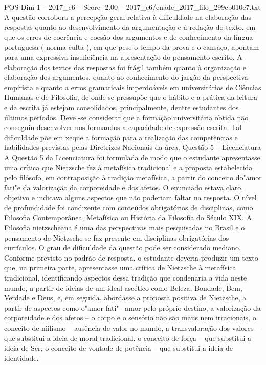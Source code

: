 \begin{textsample}{POS Dim 1 – 2017\_c6 – Score -2.00 – 2017\_c6/enade\_2017\_filo\_299cb010c7.txt}
A questão corrobora a percepção geral relativa à dificuldade na elaboração das respostas quanto ao desenvolvimento da argumentação e à redação do texto, em que os erros de coerência e coesão dos argumentos e de conhecimento da língua portuguesa ( norma culta ), em que pese o tempo da prova e o cansaço, apontam para uma expressiva insuficiência na apresentação do pensamento escrito.
A elaboração dos textos das respostas foi frágil também quanto à organização e elaboração dos argumentos, quanto ao conhecimento do jargão da perspectiva empirista e quanto a erros gramaticais imperdoáveis em universitários de Ciências Humanas e de Filosofia, de onde se pressupõe que o hábito e a prática da leitura e da escrita já estejam consolidados, principalmente, dentre estudantes dos últimos períodos.
Deve -se considerar que a formação universitária obtida não conseguiu desenvolver nos formandos a capacidade de expressão escrita.
Tal dificuldade põe em xeque a formação para a realização das competências e habilidades previstas pelas Diretrizes Nacionais da área.
Questão 5 – Licenciatura A Questão 5 da Licenciatura foi formulada de modo que o estudante apresentasse uma crítica que Nietzsche fez à metafísica tradicional e a proposta estabelecida pelo filósofo, em contraposição à tradição metafísica, a partir do conceito do"amor fati"e da valorização da corporeidade e dos afetos.
O enunciado estava claro, objetivo e indicava alguns aspectos que não poderiam faltar na resposta.
O nível de profundidade foi condizente com conteúdos obrigatórios de disciplinas, como Filosofia Contemporânea, Metafísica ou História da Filosofia do Século XIX.
A Filosofia nietzscheana é uma das perspectivas mais pesquisadas no Brasil e o pensamento de Nietzsche se faz presente em disciplinas obrigatórias dos currículos.
O grau de dificuldade da questão pode ser considerado mediano.
Conforme previsto no padrão de resposta, o estudante deveria produzir um texto que, na primeira parte, apresentasse uma crítica de Nietzsche à metafísica tradicional, identificando aspectos dessa tradição que condenaria a vida neste mundo, a partir de ideias de um ideal ascético como Beleza, Bondade, Bem, Verdade e Deus, e, em seguida, abordasse a proposta positiva de Nietzsche, a partir de aspectos como o"amor fati"– amor pelo próprio destino, a valorização da corporeidade e dos afetos – o corpo e o sensório não são maus nem irracionais, o conceito de niilismo – ausência de valor no mundo, a transvaloração dos valores – que substitui a ideia de moral tradicional, o conceito de força – que substitui a ideia de Ser, o conceito de vontade de potência – que substitui a ideia de identidade.

\end{textsample}

